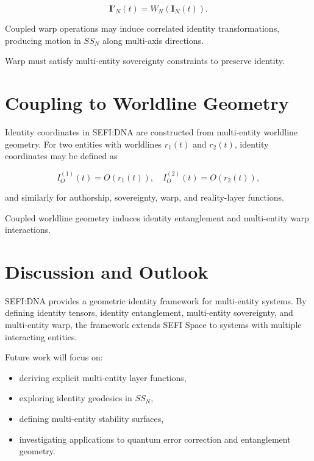 \documentclass[12pt,twoside]{article}
\begin{document}
\[
\mathbf{I}'_{N}(t) = W_{N}(\mathbf{I}_{N}(t)).
\]



Coupled warp operations may induce correlated identity transformations, producing motion
in $SS_{N}$ along multi-axis directions.

Warp must satisfy multi-entity sovereignty constraints to preserve identity.

\section{Coupling to Worldline Geometry}

Identity coordinates in SEFI:DNA are constructed from multi-entity worldline geometry.
For two entities with worldlines $r_{1}(t)$ and $r_{2}(t)$, identity coordinates may be defined
as



\[
I_{O}^{(1)}(t) = O(r_{1}(t)), \quad I_{O}^{(2)}(t) = O(r_{2}(t)),
\]



and similarly for authorship, sovereignty, warp, and reality-layer functions.

Coupled worldline geometry induces identity entanglement and multi-entity warp
interactions.

\section{Discussion and Outlook}

SEFI:DNA provides a geometric identity framework for multi-entity systems. By defining
identity tensors, identity entanglement, multi-entity sovereignty, and multi-entity warp, the
framework extends SEFI Space to systems with multiple interacting entities.

Future work will focus on:

\begin{itemize}
    \item deriving explicit multi-entity layer functions,
    \item exploring identity geodesics in $SS_{N}$,
    \item defining multi-entity stability surfaces,
    \item investigating applications to quantum error correction and entanglement geometry.
\end{itemize}

\end{document}
